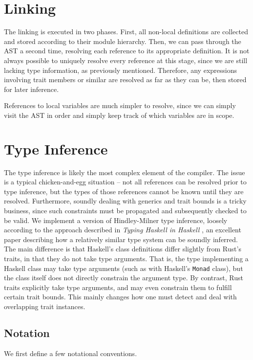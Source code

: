 \section{Linking}
The linking is executed in two phases. First, all non-local definitions are collected and stored according to their module hierarchy. Then, we can pass through the AST a second time, resolving each reference to its appropriate definition. It is not always possible to uniquely resolve every reference at this stage, since we are still lacking type information, as previously mentioned. Therefore, any expressions involving trait members or similar are resolved as far as they can be, then stored for later inference. \par
References to local variables are much simpler to resolve, since we can simply visit the AST in order and simply keep track of which variables are in scope.

\section{Type Inference}

The type inference is likely the most complex element of the compiler. The issue is a typical chicken-and-egg situation -- not all references can be resolved prior to type inference, but the types of those references cannot be known until they are resolved. Furthermore, soundly dealing with generics and trait bounds is a tricky business, since such constraints must be propagated and subsequently checked to be valid. We implement a version of Hindley-Milner type inference, loosely according to the approach described in \textit{Typing Haskell in Haskell} \cite{thih}, an excellent paper describing how a relatively similar type system can be soundly inferred. The main difference is that Haskell's class definitions differ slightly from Rust's traits, in that they do not take type arguments. That is, the type implementing a Haskell class may take type arguments (such as with Haskell's \lstinline{Monad} class), but the class itself does not directly constrain the argument type. By contrast, Rust traits explicitly take type arguments, and may even constrain them to fulfill certain trait bounds. This mainly changes how one must detect and deal with overlapping trait instances.

\subsection{Notation}
We first define a few notational conventions.

